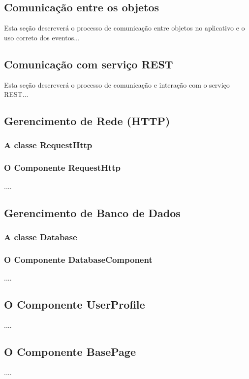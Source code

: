 \subsection{Comunicação entre os objetos}
Esta seção descreverá o processo de comunicação entre objetos no aplicativo e o uso correto dos eventos...


\subsection{Comunicação com serviço REST}
Esta seção descreverá o processo de comunicação e interação com o serviço REST...


\subsection{Gerencimento de Rede (HTTP)}\label{sec:solucao-desenvolvida}
\subsubsection{A classe RequestHttp}\label{sec:solucao-desenvolvida}
\subsubsection{O Componente RequestHttp}\label{sec:solucao-desenvolvida}
....


\subsection{Gerencimento de Banco de Dados}\label{sec:solucao-desenvolvida}
\subsubsection{A classe Database}\label{sec:solucao-desenvolvida}
\subsubsection{O Componente DatabaseComponent}\label{sec:solucao-desenvolvida}
....


\subsection{O Componente UserProfile}\label{sec:solucao-desenvolvida}
....


\subsection{O Componente BasePage}\label{sec:solucao-desenvolvida}
....


